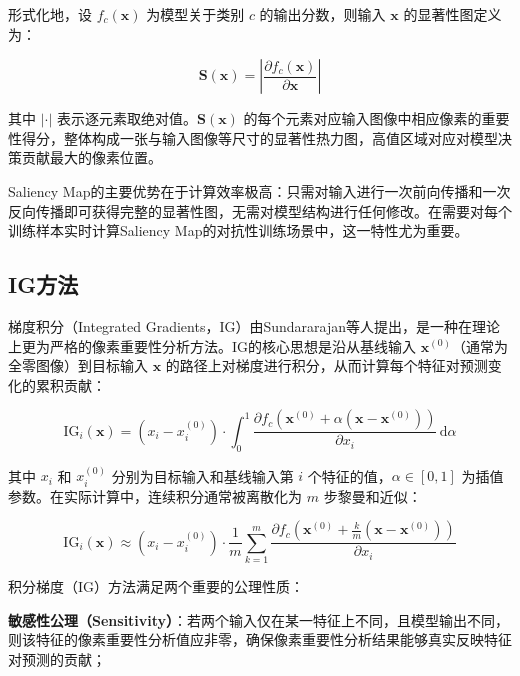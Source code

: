 形式化地，设 $f_c(\mathbf{x})$ 为模型关于类别 $c$ 的输出分数，则输入 $\mathbf{x}$ 的显著性图定义为：

\begin{equation}
  \mathbf{S}(\mathbf{x}) = \left| \frac{\partial f_c(\mathbf{x})}{\partial \mathbf{x}} \right|
\end{equation}

其中 $|\cdot|$ 表示逐元素取绝对值。$\mathbf{S}(\mathbf{x})$ 的每个元素对应输入图像中相应像素的重要性得分，整体构成一张与输入图像等尺寸的显著性热力图，高值区域对应对模型决策贡献最大的像素位置。

Saliency Map的主要优势在于计算效率极高：只需对输入进行一次前向传播和一次反向传播即可获得完整的显著性图，无需对模型结构进行任何修改。在需要对每个训练样本实时计算Saliency Map的对抗性训练场景中，这一特性尤为重要。

\subsection{IG方法}

梯度积分（Integrated Gradients，IG）由Sundararajan等人提出\cite{sundararajan2017ig}，是一种在理论上更为严格的像素重要性分析方法。IG的核心思想是沿从基线输入 $\mathbf{x}^{(0)}$（通常为全零图像）到目标输入 $\mathbf{x}$ 的路径上对梯度进行积分，从而计算每个特征对预测变化的累积贡献：

\begin{equation}
  \text{IG}_i(\mathbf{x}) = \left(x_i - x^{(0)}_i\right) \cdot \int_0^1 \frac{\partial f_c\!\left(\mathbf{x}^{(0)} + \alpha\!\left(\mathbf{x} - \mathbf{x}^{(0)}\right)\right)}{\partial x_i} \, \mathrm{d}\alpha
\end{equation}

其中 $x_i$ 和 $x^{(0)}_i$ 分别为目标输入和基线输入第 $i$ 个特征的值，$\alpha \in [0, 1]$ 为插值参数。在实际计算中，连续积分通常被离散化为 $m$ 步黎曼和近似：

\begin{equation}
  \text{IG}_i(\mathbf{x}) \approx \left(x_i - x^{(0)}_i\right) \cdot \frac{1}{m} \sum_{k=1}^{m} \frac{\partial f_c\!\left(\mathbf{x}^{(0)} + \frac{k}{m}\!\left(\mathbf{x} - \mathbf{x}^{(0)}\right)\right)}{\partial x_i}
\end{equation}

积分梯度（IG）方法满足两个重要的公理性质：

\textbf{敏感性公理（Sensitivity）}：若两个输入仅在某一特征上不同，且模型输出不同，则该特征的像素重要性分析值应非零，确保像素重要性分析结果能够真实反映特征对预测的贡献；

